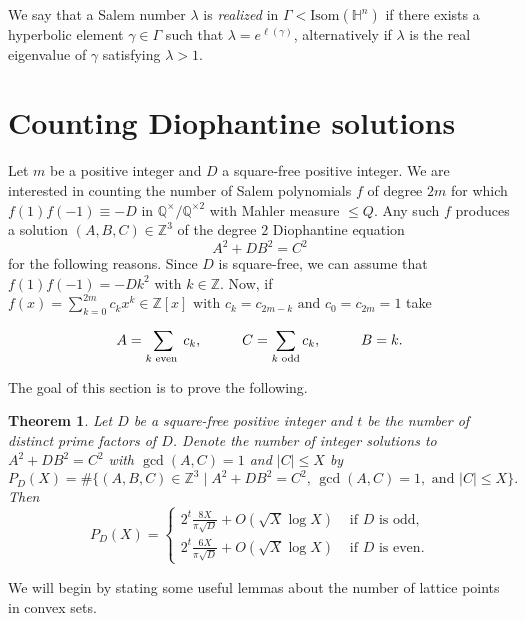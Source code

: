 \documentclass[12pt]{amsart}
\renewcommand{\H}{\mathbb{H}}
\newcommand{\Q}{\mathbb{Q}}
\newcommand{\Z}{\mathbb{Z}}
\theoremstyle{plain}
\newtheorem{theorem}{Theorem}[section]
\begin{document}
We say that a Salem number $\lambda$ is \emph{realized} in $\Gamma<\mathrm{Isom}(\H^{n})$ if there exists a hyperbolic element $\gamma\in \Gamma$ such that $\lambda=e^{\ell(\gamma)}$, alternatively if $\lambda$ is the real eigenvalue of $\gamma$ satisfying $\lambda>1$.



\section{Counting Diophantine solutions} \label{s:Diophantine}

Let $m$ be a positive integer and $D$ a square-free positive integer. We are interested in counting the number of Salem polynomials $f$ of degree $2m$ for which $f(1)f(-1)\equiv -D$ in $\Q^{\times}/\Q^{\times 2}$ with Mahler measure $\leq Q$. Any such $f$ produces a solution $(A,B,C)\in\mathbb{Z}^3$ of the degree $2$ Diophantine equation 
\begin{equation}\label{eq:diophantine eq}
 A^2+DB^2=C^2  
\end{equation}
for the following reasons. Since $D$ is square-free, we can assume that $f(1)f(-1)=-Dk^2$ with $k\in\Z$. Now, if $f(x)=\sum^{2m}_{k=0} c_k x^k \in\Z[x] \text{ with }c_k=c_{2m-k} \text{ and } c_0=c_{2m}=1$ take 

\[A=\sum_{k\\ \text{ even }} c_k,\hspace{1cm} C=\sum_{k \text{ odd}} c_k,\hspace{1cm} B=k.\]

The goal of this section is to prove the following.

\begin{theorem}\label{th:diop. sol.}
    Let $D$ be a square-free positive integer and $t$ be the number of distinct prime factors of $D$. Denote the number of integer solutions to $A^2+DB^2=C^2$ with $\gcd(A,C)=1$ and $|C|\leq X$ by
    \[ P_D(X)=\#\{(A,B,C)\in \Z^{3}\mid A^2+DB^2=C^2, \, \gcd(A,C)=1,  \text{  and  } |C|\leq X\}.
    \]
    Then
    \[ P_D(X) = \begin{cases}
    2^{t}\frac{8X}{\pi\sqrt{D}} + O(\sqrt{X}\log X)   &\text{ if $D$ is odd},\\
    2^{t}\frac{6X}{\pi\sqrt{D}} + O(\sqrt{X}\log X)   &\text{ if $D$ is even} .
    \end{cases} \]
\end{theorem}

We will begin by stating some useful lemmas about the number of lattice points in convex sets. 
\end{document}
